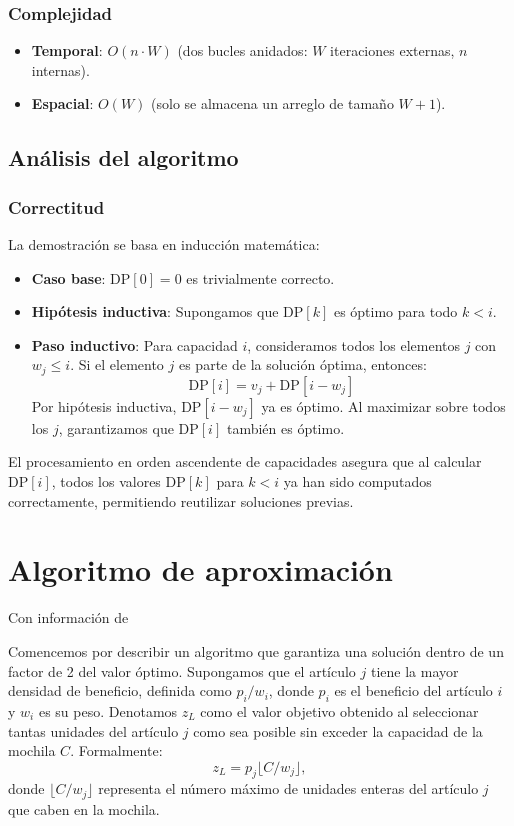\documentclass{report}
\begin{document}
\subsubsection*{Complejidad}
\begin{itemize}
    \item \textbf{Temporal}: $O(n \cdot W)$ (dos bucles anidados: $W$ iteraciones externas, $n$ internas).
    \item \textbf{Espacial}: $O(W)$ (solo se almacena un arreglo de tamaño $W+1$).
\end{itemize}

\subsection{Análisis del algoritmo}
\subsubsection*{Correctitud}
La demostración se basa en inducción matemática:

\begin{itemize}
    \item \textbf{Caso base}: $\text{DP}[0] = 0$ es trivialmente correcto.
    
    \item \textbf{Hipótesis inductiva}: Supongamos que $\text{DP}[k]$ es óptimo para todo $k < i$.
    
    \item \textbf{Paso inductivo}: Para capacidad $i$, consideramos todos los elementos $j$ con $w_j \leq i$. Si el elemento $j$ es parte de la solución óptima, entonces:
    \[
    \text{DP}[i] = v_j + \text{DP}[i - w_j]
    \]
    Por hipótesis inductiva, $\text{DP}[i - w_j]$ ya es óptimo. Al maximizar sobre todos los $j$, garantizamos que $\text{DP}[i]$ también es óptimo.
\end{itemize}

El procesamiento en orden ascendente de capacidades asegura que al calcular $\text{DP}[i]$, todos los valores $\text{DP}[k]$ para $k < i$ ya han sido computados correctamente, permitiendo reutilizar soluciones previas.


\section{Algoritmo de aproximación}
Con información de \cite{Rhee2016}

Comencemos por describir un algoritmo que garantiza una solución dentro de un factor de 2 del valor óptimo. Supongamos que el artículo $ j $ tiene la mayor densidad de beneficio, definida como $ p_i / w_i $, donde $ p_i $ es el beneficio del artículo $ i $ y $ w_i $ es su peso. Denotamos $ z_L $ como el valor objetivo obtenido al seleccionar tantas unidades del artículo $ j $ como sea posible sin exceder la capacidad de la mochila $ C $. Formalmente:
\[
z_L = p_j \lfloor C / w_j \rfloor,
\]
donde $ \lfloor C / w_j \rfloor $ representa el número máximo de unidades enteras del artículo $ j $ que caben en la mochila.
\end{document}
